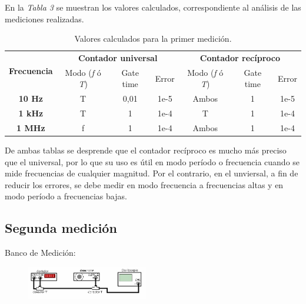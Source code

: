 \documentclass{article}
\begin{document}
	En la \textit{Tabla 3} se muestran los valores calculados, correspondiente al análisis de las mediciones realizadas.
\bigskip\bigskip

\begin{table}[!hbt]
	\begin{center}

		\begin{tabular}{|c|c|c|c|c|c|c|} \hline
			\multirow{2}{*}{\textbf{Frecuencia}}
			& \multicolumn{3}{c|}{\textbf{Contador universal}} & \multicolumn{3}{c|}{\textbf{Contador recíproco}} \\\cline{2-7}
			& Modo (\textit{f} ó \textit{T}) & Gate time & Error & Modo (\textit{f} ó \textit{T}) & Gate time & Error \\\hline
			
			\textbf{10 Hz} & T & 0,01 & 1e-5 & Ambos & 1 & 1e-5 \\\hline
			\textbf{1 kHz} & T & 1 & 1e-4 & T & 1 & 1e-4 \\\hline
			\textbf{1 MHz} & f & 1 & 1e-4 & Ambos & 1 & 1e-4 \\\hline
		\end{tabular}

	\caption{Valores calculados para la primer medición.}
	\end{center}
\end{table}
\medskip\medskip

		
		De ambas tablas se desprende que el contador recíproco es mucho más preciso que el universal, por lo que su uso es útil en modo período o frecuencia cuando se mide frecuencias de cualquier magnitud. Por el contrario, en el unviersal, a fin de reducir los errores, se debe medir en modo frecuencia a frecuencias altas y en modo período a frecuencias bajas.



\subsection{Segunda medición}
\medskip


	Banco de Medición:
	
	\begin{figure}[h]
				\centering
				\includegraphics[width=0.47\textwidth]{images/bancoMedicionMed2.jpg}
				\medskip
	\end{figure}
	\bigskip\bigskip
	
\end{document}
